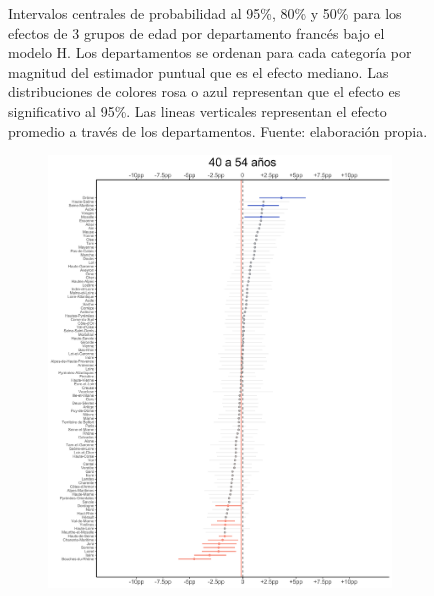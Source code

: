 \begin{figure}
\begin{subfigure}{0.3\textwidth}
	\end{subfigure}
	\caption{Intervalos centrales de probabilidad al 95\%, 80\% y 50\% para los efectos de 3 grupos de edad por departamento francés bajo el modelo H. Los departamentos se ordenan para cada categoría por magnitud del estimador puntual que es el efecto mediano. Las distribuciones de colores rosa o azul representan que el efecto es significativo al 95\%. Las lineas verticales representan el efecto promedio a través de los departamentos. Fuente: elaboración propia.}
	\label{fig:Efectos_Edad_1}
\end{figure}

\begin{figure}
	\centering
	\begin{subfigure}{0.3\textwidth}
	\includegraphics[width = \textwidth]{Figs/Efectos/Efectos_Ed4_Modelo_H}
	\end{subfigure}
	~
	\begin{subfigure}{0.3\textwidth}

\end{subfigure}
\end{figure}
